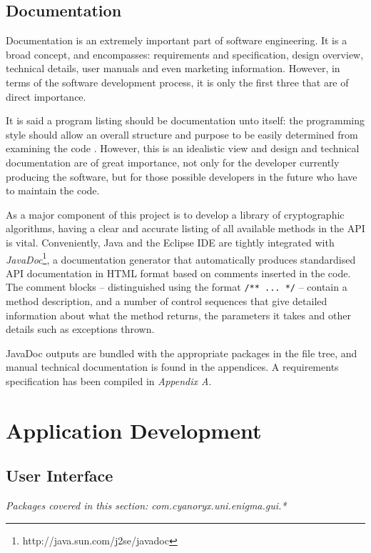 \subsection{Documentation}

Documentation is an extremely important part of software engineering. It is a broad concept, and encompasses: requirements and specification, design overview, technical details, user manuals and even marketing information. However, in terms of the software development process, it is only the first three that are of direct importance. 

It is said a program listing should be documentation unto itself: the programming style should allow an overall structure and purpose to be easily determined from examining the code \cite{McConnell:2004tv}. However, this is an idealistic view and design and technical documentation are of great importance, not only for the developer currently producing the software, but for those possible developers in the future who have to maintain the code.

As a major component of this project is to develop a library of cryptographic algorithms, having a clear and accurate listing of all available methods in the API is vital. Conveniently, Java and the Eclipse IDE are tightly integrated with \emph{JavaDoc}\footnote{http://java.sun.com/j2se/javadoc}, a documentation generator that automatically produces standardised API documentation in HTML format based on comments inserted in the code. The comment blocks -- distinguished using the format \verb!/** ... */! -- contain a method description, and a number of control sequences that give detailed information about what the method returns, the parameters it takes and other details such as exceptions thrown.

JavaDoc outputs are bundled with the appropriate packages in the file tree, and manual technical documentation is found in the appendices. A requirements specification has been compiled in \emph{Appendix A}.

\section{Application Development}

\subsection{User Interface}
\emph{Packages covered in this section: com.cyanoryx.uni.enigma.gui.*}


